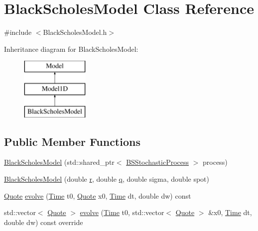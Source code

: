 \hypertarget{class_black_scholes_model}{}\section{Black\+Scholes\+Model Class Reference}
\label{class_black_scholes_model}


{\ttfamily \#include $<$Black\+Scholes\+Model.\+h$>$}

Inheritance diagram for Black\+Scholes\+Model\+:\begin{figure}[H]
\begin{center}
\leavevmode
\includegraphics[height=3.000000cm]{class_black_scholes_model}
\end{center}
\end{figure}
\subsection*{Public Member Functions}
\begin{DoxyCompactItemize}
\item 
\hyperlink{class_black_scholes_model_a5cc9ce0cdb0f040da65677b2c07f09b5}{Black\+Scholes\+Model} (std\+::shared\+\_\+ptr$<$ \hyperlink{class_b_s_stochastic_process}{B\+S\+Stochastic\+Process} $>$ process)
\item 
\hyperlink{class_black_scholes_model_a59aa736bd849bc59fed035f702e9813b}{Black\+Scholes\+Model} (double \hyperlink{_uniform_l_ecuyer_r_n_g1_8cpp_a372556d73d7e403d9b677b89b21ee572}{r}, double \hyperlink{_uniform_l_ecuyer_r_n_g1_8cpp_a5cf10165494588b84d4231e0e8a5b1a9}{q}, double sigma, double spot)
\item 
\hyperlink{_name_def_8h_a642a6c5fd87319d922637de0e0bb0305}{Quote} \hyperlink{class_black_scholes_model_abcbe5f02a1820adf876b1981c78dc43a}{evolve} (\hyperlink{_name_def_8h_ac2d3e0ba793497bcca555c7c2cf64ff3}{Time} t0, \hyperlink{_name_def_8h_a642a6c5fd87319d922637de0e0bb0305}{Quote} x0, \hyperlink{_name_def_8h_ac2d3e0ba793497bcca555c7c2cf64ff3}{Time} dt, double dw) const
\item 
std\+::vector$<$ \hyperlink{_name_def_8h_a642a6c5fd87319d922637de0e0bb0305}{Quote} $>$ \hyperlink{class_black_scholes_model_ae7ece51fd9f0eac3f77975cff857216d}{evolve} (\hyperlink{_name_def_8h_ac2d3e0ba793497bcca555c7c2cf64ff3}{Time} t0, std\+::vector$<$ \hyperlink{_name_def_8h_a642a6c5fd87319d922637de0e0bb0305}{Quote} $>$ \&x0, \hyperlink{_name_def_8h_ac2d3e0ba793497bcca555c7c2cf64ff3}{Time} dt, double dw) const override
\end{DoxyCompactItemize}
